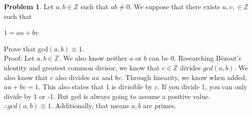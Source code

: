 \documentclass[letterpaper, 12pt]{article}
\theoremstyle{definition}
\newtheorem{pb}{Problem} %
\begin{document}
\begin{spacing}{1.33}
\begin{pb}
    Let $a, b \in \mathbb{Z}$ such that $ab \neq 0$. We suppose that there exists $u, v, \in \mathbb{Z}$ such that
    \begin{center}
        $1 = au + bv$
    \end{center}
    Prove that gcd$(a, b) \equiv 1$.\\


    Proof: Let $a, b \in \mathbb{Z}$. We also know neither $a$ or $b$ can be $0$. Researching B\'ezout's identity and greatest common divisor, we know that $c \in \mathbb{Z}$ divides $gcd(a,b)$. We also know that $c$ also divides $au$ and $bv$. Through linearity, we know when added, $au + bv = 1$. This also states that 1 is divisible by $c$. If you divide 1, you can only divide by 1 or -1. But gcd is always going to assume a positive value.
    $\therefore gcd(a,b) \equiv 1$. Additionally, that means $a, b$ are primes.
\end{pb}


\end{spacing}
\end{document}
